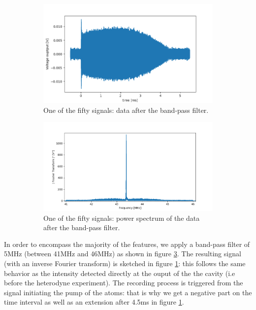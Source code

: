 \documentclass[10pt]{report}
\begin{document}
\begin{figure}[h!]
\centering
\begin{subfigure}{.48\textwidth}
  \centering
  \includegraphics[width=1.1\linewidth]{sp-f-bpf}
  \caption{One of the fifty signals: data after the band-pass filter.}
  \label{fig:sp-f-bpf}
\end{subfigure}%
\hspace{1em}%
\begin{subfigure}{.48\textwidth}
  \centering
  \includegraphics[width=1.1\linewidth]{sp-fft-bpf}
  \caption{One of the fifty signals: power spectrum of the data after the band-pass filter.}
  \label{fig:sp-fft-bpf}
\end{subfigure}
\caption{}
\end{figure}

In order to encompass the majority of the features, we apply a band-pass filter of 5MHz (between 41MHz and 46MHz) as shown in figure \ref{fig:sp-fft-bpf}. The resulting signal (with an inverse Fourier transform) is sketched in figure \ref{fig:sp-f-bpf}: this follows the same behavior as the intensity detected directly at the ouput of the the cavity (i.e before the heterodyne experiment). The recording process is triggered from the signal initiating the pump of the atoms: that is why we get a negative part on the time interval as well as an extension after 4.5ms in figure \ref{fig:sp-f-bpf}.
\end{document}
